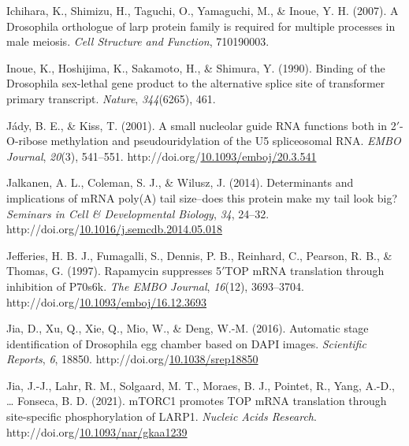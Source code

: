 \documentclass[12pt,oneside]{reedthesis}
\newlength{\cslhangindent}
\newenvironment{CSLReferences}[2] %
 {%
  \setlength{\parindent}{0pt}
  \ifodd #1 \everypar{\setlength{\hangindent}{\cslhangindent}}\ignorespaces\fi
  \ifnum #2 > 0
  \setlength{\parskip}{#2\baselineskip}
  \fi
 }%
 {}
\begin{document}
\begin{CSLReferences}{1}{0}
\leavevmode{}%
Ichihara, K., Shimizu, H., Taguchi, O., Yamaguchi, M., \& Inoue, Y. H. (2007). A {Drosophila} orthologue of larp protein family is required for multiple processes in male meiosis. \emph{Cell Structure and Function}, 710190003.

\leavevmode{}%
Inoue, K., Hoshijima, K., Sakamoto, H., \& Shimura, Y. (1990). Binding of the {Drosophila} sex-lethal gene product to the alternative splice site of transformer primary transcript. \emph{Nature}, \emph{344}(6265), 461.

\leavevmode{}%
Jády, B. E., \& Kiss, T. (2001). A small nucleolar guide {RNA} functions both in 2{\({'}\)}-{O}-ribose methylation and pseudouridylation of the {U5} spliceosomal {RNA}. \emph{EMBO Journal}, \emph{20}(3), 541--551. http://doi.org/\href{https://doi.org/10.1093/emboj/20.3.541}{10.1093/emboj/20.3.541}

\leavevmode{}%
Jalkanen, A. L., Coleman, S. J., \& Wilusz, J. (2014). Determinants and implications of {mRNA} poly({A}) tail size--does this protein make my tail look big? \emph{Seminars in Cell \& Developmental Biology}, \emph{34}, 24--32. http://doi.org/\href{https://doi.org/10.1016/j.semcdb.2014.05.018}{10.1016/j.semcdb.2014.05.018}

\leavevmode{}%
Jefferies, H. B. J., Fumagalli, S., Dennis, P. B., Reinhard, C., Pearson, R. B., \& Thomas, G. (1997). Rapamycin suppresses 5{\({'}\)}{TOP mRNA} translation through inhibition of P70s6k. \emph{The EMBO Journal}, \emph{16}(12), 3693--3704. http://doi.org/\href{https://doi.org/10.1093/emboj/16.12.3693}{10.1093/emboj/16.12.3693}

\leavevmode{}%
Jia, D., Xu, Q., Xie, Q., Mio, W., \& Deng, W.-M. (2016). Automatic stage identification of {Drosophila} egg chamber based on {DAPI} images. \emph{Scientific Reports}, \emph{6}, 18850. http://doi.org/\href{https://doi.org/10.1038/srep18850}{10.1038/srep18850}

\leavevmode{}%
Jia, J.-J., Lahr, R. M., Solgaard, M. T., Moraes, B. J., Pointet, R., Yang, A.-D., \ldots{} Fonseca, B. D. (2021). {mTORC1} promotes {TOP mRNA} translation through site-specific phosphorylation of {LARP1}. \emph{Nucleic Acids Research}. http://doi.org/\href{https://doi.org/10.1093/nar/gkaa1239}{10.1093/nar/gkaa1239}


\end{CSLReferences}
\end{document}
